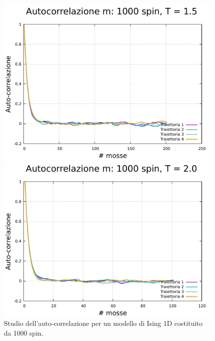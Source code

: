\begin{figure}[htbp]
    \begin{minipage}{0.45\textwidth}  
      \centering
      \includegraphics[page=1, width=\textwidth]{Immagini/simIsing1D/magn0.02/tcorr/tcorr_1000_1.5.pdf}
      \caption{$T\,=\,1.5$}
    \end{minipage}\hfill
    \begin{minipage}{0.45\textwidth}  
      \centering
      \includegraphics[page=1, width=\textwidth]{Immagini/simIsing1D/magn0.02/tcorr/tcorr_1000_2.0.pdf}
      \caption{$T\,=\,2.0$}
    \end{minipage}
    \caption{Studio dell'auto-correlazione per un modello di Ising 1D costituito da 1000 spin.}
\end{figure}

